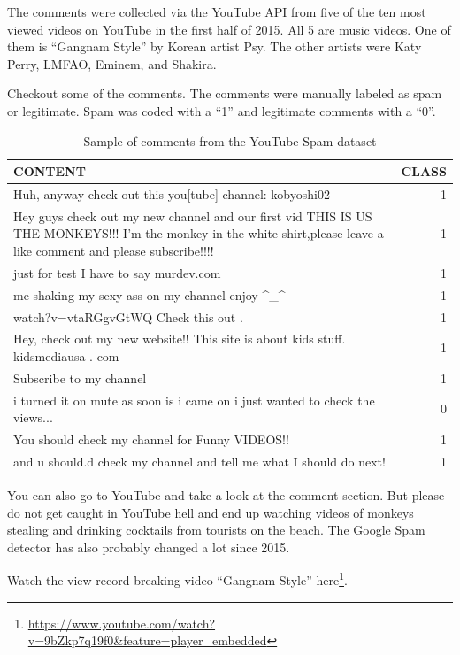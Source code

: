 \documentclass[
  10pt,
]{scrbook}
\renewcommand{\href}[2]{#2\footnote{\url{#1}}}
\begin{document}
The comments were collected via the YouTube API from five of the ten most viewed videos on YouTube in the first half of 2015.
All 5 are music videos.
One of them is ``Gangnam Style'' by Korean artist Psy.
The other artists were Katy Perry, LMFAO, Eminem, and Shakira.

Checkout some of the comments.
The comments were manually labeled as spam or legitimate.
Spam was coded with a ``1'' and legitimate comments with a ``0''.

\begin{table}

\caption{\label{tab:show-dating-data-TubeSpam}Sample of comments from the YouTube Spam dataset}
\centering
\begin{tabular}[t]{>{\raggedright\arraybackslash}p{10cm}r}
\toprule
CONTENT & CLASS\\
\midrule
Huh, anyway check out this you[tube] channel: kobyoshi02 & 1\\
Hey guys check out my new channel and our first vid THIS IS US THE  MONKEYS!!! I'm the monkey in the white shirt,please leave a like comment  and please subscribe!!!! & 1\\
just for test I have to say murdev.com & 1\\
me shaking my sexy ass on my channel enjoy \textasciicircum{}\_\textasciicircum{} & 1\\
watch?v=vtaRGgvGtWQ   Check this out . & 1\\
\addlinespace
Hey, check out my new website!! This site is about kids stuff. kidsmediausa  . com & 1\\
Subscribe to my channel & 1\\
i turned it on mute as soon is i came on i just wanted to check the  views... & 0\\
You should check my channel for Funny VIDEOS!! & 1\\
and u should.d check my channel and tell me what I should do next! & 1\\
\bottomrule
\end{tabular}
\end{table}

You can also go to YouTube and take a look at the comment section.
But please do not get caught in YouTube hell and end up watching videos of monkeys stealing and drinking cocktails from tourists on the beach.
The Google Spam detector has also probably changed a lot since 2015.

\href{https://www.youtube.com/watch?v=9bZkp7q19f0\&feature=player_embedded}{Watch the view-record breaking video ``Gangnam Style'' here}.
\end{document}
